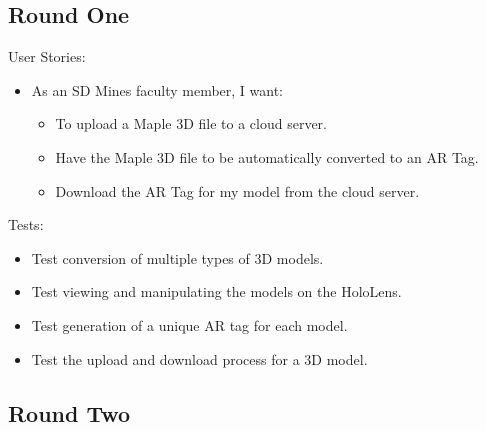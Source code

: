 \subsection{Round One}

User Stories:
\begin{itemize}
	\item As an SD Mines faculty member, I want:
		\begin{itemize}
			\item To upload a Maple 3D file to a cloud server.
			\item Have the Maple 3D file to be automatically converted to an AR 
			Tag.
			\item Download the AR Tag for my model from the cloud server.
		\end{itemize}
\end{itemize}
Tests:
\begin{itemize}
	\item Test conversion of multiple types of 3D models.
	\item Test viewing and manipulating the models on the HoloLens.
	\item Test generation of a unique AR tag for each model.
	\item Test the upload and download process for a 3D model.
\end{itemize}

\subsection{Round Two}


